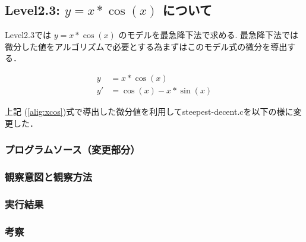 \subsection{Level2.3: $y=x*\cos(x)$ について}
Level2.3では $y=x*\cos(x)$ のモデルを最急降下法で求める.
最急降下法では微分した値をアルゴリズムで必要とする為まずはこのモデル式の微分を導出する．

\begin{align}
    y &= x * \cos(x) \\
    y' &= \cos(x) - x * \sin(x)
    \label{alig:xcos}
\end{align}

上記 (\ref{alig:xcos})式で導出した微分値を利用してsteepest-decent.cを以下の様に変更した．

\subsubsection{プログラムソース（変更部分）}
\subsubsection{観察意図と観察方法}
\subsubsection{実行結果}
\subsubsection{考察}

